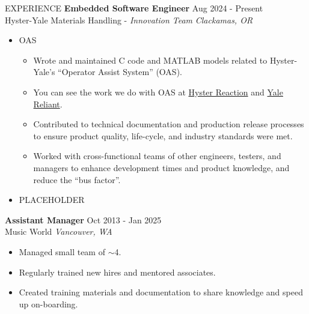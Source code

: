 \documentclass{resume} %
\begin{document}
	\begin{rSection}{EXPERIENCE}
		\textbf{Embedded Software Engineer} \hfill Aug 2024 - Present \\
		Hyster-Yale Materials Handling - \textit{Innovation Team} \hfill \textit{Clackamas, OR}
		\begin{itemize} \itemsep -5pt {}
			\item OAS
			\begin{itemize} \itemsep -5pt {}
				\item Wrote and maintained C code and MATLAB models related to Hyster-Yale's ``Operator Assist System'' (OAS). 
				\item You can see the work we do with OAS at \href{https://www.hyster.com/en-us/north-america/technology/telematics/hyster-reaction/}{Hyster Reaction} and \href{https://www.yale.com/en-us/north-america/technology/yale-reliant/}{Yale Reliant}.
				
				\item Contributed to technical documentation and production release processes to ensure product quality, life-cycle, and industry standards were met.
				\item Worked with cross-functional teams of other engineers, testers, and managers to enhance development times and product knowledge, and reduce the ``bus factor''.
			\end{itemize}
			
			\item PLACEHOLDER
			
		\end{itemize}
	
		\textbf{Assistant Manager} \hfill Oct 2013 - Jan 2025 \\
		Music World \hfill \textit{Vancouver, WA}
		\begin{itemize} \itemsep -5pt {} 
			\item Managed small team of $\sim$4.
			\item Regularly trained new hires and mentored associates. 
			\item Created training materials and documentation to share knowledge and speed up on-boarding.
		\end{itemize}
	\end{rSection} 

	
\end{document}
